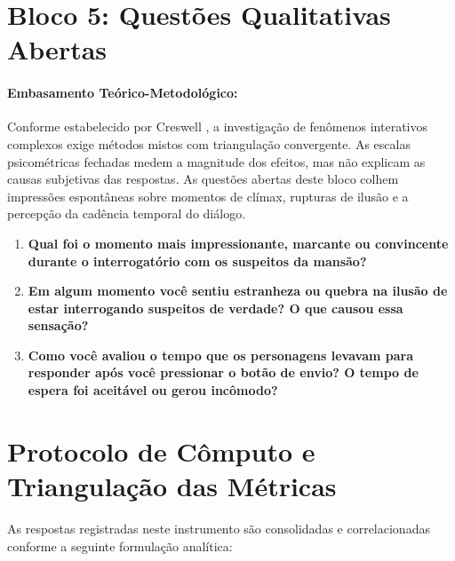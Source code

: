 \section{Bloco 5: Questões Qualitativas Abertas}
\label{sec:apendice_d_bloco5}

\paragraph*{Embasamento Teórico-Metodológico:} Conforme estabelecido por Creswell \cite{creswell2014research}, a investigação de fenômenos interativos complexos exige métodos mistos com triangulação convergente. As escalas psicométricas fechadas medem a magnitude dos efeitos, mas não explicam as causas subjetivas das respostas. As questões abertas deste bloco colhem impressões espontâneas sobre momentos de clímax, rupturas de ilusão e a percepção da cadência temporal do diálogo.

\begin{enumerate}[label=\textbf{Q\arabic*.}, noitemsep, topsep=1pt, parsep=0pt]
    \item \textbf{Qual foi o momento mais impressionante, marcante ou convincente durante o interrogatório com os suspeitos da mansão?}
    \item \textbf{Em algum momento você sentiu estranheza ou quebra na ilusão de estar interrogando suspeitos de verdade? O que causou essa sensação?}
    \item \textbf{Como você avaliou o tempo que os personagens levavam para responder após você pressionar o botão de envio? O tempo de espera foi aceitável ou gerou incômodo?}
\end{enumerate}

\vspace{0.05cm}

\section{Protocolo de Cômputo e Triangulação das Métricas}
\label{sec:apendice_d_computo}

As respostas registradas neste instrumento são consolidadas e correlacionadas conforme a seguinte formulação analítica:

